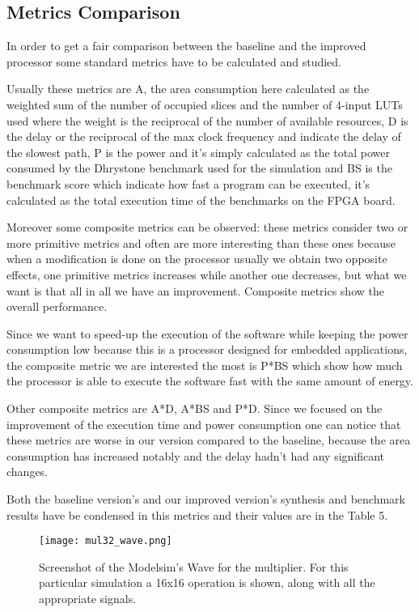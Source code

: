 \subsection{Metrics Comparison}

In order to get a fair comparison between the baseline and the improved processor some standard
metrics have to be calculated and studied.

Usually these metrics are A, the area consumption here calculated as the weighted sum of the
number of occupied slices and the number of 4-input LUTs used where the weight is the reciprocal
of the number of available resources, D is the delay or the reciprocal of the max clock frequency
and indicate the delay of the slowest path, P is the power and it's simply calculated as the total
power consumed by the Dhrystone benchmark used for the simulation and BS is the benchmark
score which indicate how fast a program can be executed, it's calculated as the total execution
time of the benchmarks on the FPGA board.

Moreover some composite metrics can be observed: these metrics consider two or more primitive
metrics and often are more interesting than these ones because when a modification is done on
the processor usually we obtain two opposite effects, one primitive metrics increases while
another one decreases, but what we want is that all in all we have an improvement. Composite
metrics show the overall performance.

Since we want to speed-up the execution of the software while keeping the power consumption
low because this is a processor designed for embedded applications, the composite metric we are
interested the most is P*BS which show how much the processor is able to execute the software
fast with the same amount of energy.

Other composite metrics are A*D, A*BS and P*D. Since we focused on the improvement of the
execution time and power consumption one can notice that these metrics are worse in our version
compared to the baseline, because the area consumption has increased notably and the delay
hadn't had any significant changes.

Both the baseline version's and our improved version's synthesis and benchmark results have be
condensed in this metrics and their values are in the Table 5.

\begin{figure}[H]
\centering
\texttt{[image: mul32\_wave.png]}
\caption{Screenshot of the Modelsim's Wave for the multiplier. For this particular simulation a 16x16 operation is shown, along with all the appropriate signals.}
\label{fig:mul32_wave}
\end{figure}
